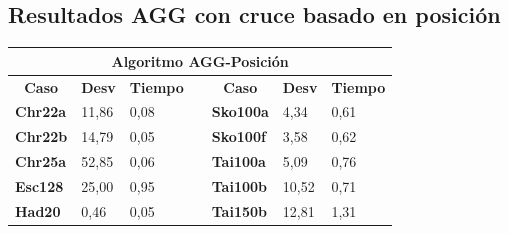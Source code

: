 \documentclass[a4paper, 12pt]{article}
\begin{document}
      \subsection{Resultados AGG con cruce basado en posición}
      \begin{table}[H]
\centering
\label{my-label}
\begin{tabular}{|l|l|l|l|l|l|l|}
\hline
\multicolumn{7}{|c|}{\textbf{Algoritmo AGG-Posición}}                                                                                                                                                                                                             \\ \hline
\multicolumn{1}{|c|}{\textbf{Caso}} & \multicolumn{1}{c|}{\textbf{Desv}} & \multicolumn{1}{c|}{\textbf{Tiempo}} & \multicolumn{1}{c|}{\textbf{}} & \multicolumn{1}{c|}{\textbf{Caso}} & \multicolumn{1}{c|}{\textbf{Desv}} & \multicolumn{1}{c|}{\textbf{Tiempo}} \\ \cline{1-3} \cline{5-7} 
\textbf{Chr22a}                     & 11,86                              & 0,08                                 &                                & \textbf{Sko100a}                   & 4,34                               & 0,61                                 \\ \cline{1-3} \cline{5-7} 
\textbf{Chr22b}                     & 14,79                              & 0,05                                 &                                & \textbf{Sko100f}                   & 3,58                               & 0,62                                 \\ \cline{1-3} \cline{5-7} 
\textbf{Chr25a}                     & 52,85                              & 0,06                                 &                                & \textbf{Tai100a}                   & 5,09                               & 0,76                                 \\ \cline{1-3} \cline{5-7} 
\textbf{Esc128}                     & 25,00                              & 0,95                                 &                                & \textbf{Tai100b}                   & 10,52                              & 0,71                                 \\ \cline{1-3} \cline{5-7} 
\textbf{Had20}                      & 0,46                               & 0,05                                 &                                & \textbf{Tai150b}                   & 12,81                              & 1,31                                 \\ \cline{1-3} \cline{5-7} 

\end{tabular}
\end{table}
\end{document}
